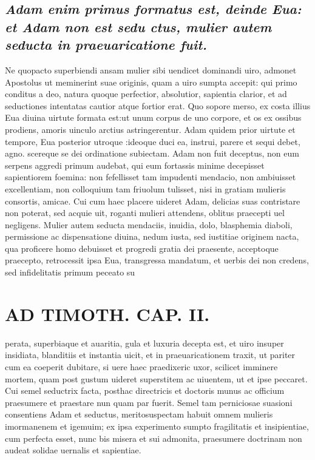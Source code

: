 \documentclass{article}
\begin{document}
\begin{pages}
\subsection*{\textit{Adam enim primus formatus est, deinde Eua: et Adam non est sedu ctus, mulier autem seducta in praeuaricatione fuit. }}\pstart Ne quopacto superbiendi ansam mulier sibi uendicet dominandi uiro, admonet Apostolus ut meminerint suae originis, quam a uiro sumpta accepit: qui primo conditus a deo, natura quoque perfectior, absolutior, sapientia clarior, et ad seductiones intentatas cautior atque fortior erat. Quo sopore merso, ex costa illius Eua diuina uirtute formata est:ut unum corpus de uno corpore, et os ex ossibus prodiens, amoris uinculo arctius astringerentur. Adam quidem prior uirtute et tempore, Eua posterior utroque :ideoque duci ea, instrui, parere et sequi debet, agno. scereque se dei ordinatione subiectam. Adam non fuit deceptus, non eum serpens aggredi primum audebat, qui eum fortassis minime decepisset sapientiorem foemina: non fefellisset tam impudenti mendacio, non ambiuisset excellentiam, non colloquium tam friuolum tulisset, nisi in gratiam mulieris consortis, amicae. Cui cum haec placere uideret Adam, delicias suas contristare non poterat, sed acquie uit, roganti mulieri attendens, oblitus praecepti uel negligens. Mulier autem seducta mendaciis, inuidia, dolo, blasphemia diaboli, permissione ac dispensatione diuina, nedum iusta, sed iustitiae originem nacta, qua proficere homo debuisset et progredi gratia dei praesente, acceptoque praecepto, retrocessit ipsa Eua, transgressa mandatum, et uerbis dei non credens, sed infidelitatis primum peceato su  \pend
\section*{AD TIMOTH. CAP. II. }
\marginpar{[ p.489 ]}\pstart perata, superbiaque et auaritia, gula et luxuria decepta est, et uiro insuper insidiata, blanditiis et instantia uicit, et in praeuaricationem traxit, ut pariter cum ea coeperit dubitare, si uere haec praedixeric uxor, scilicet imminere mortem, quam post gustum uideret superstitem ac uiuentem, ut et ipse peccaret. Cui semel seductrix facta, posthac directricis et doctoris munus ac officium praesumere et praestare nun quam par fuerit. Semel tam perniciosae suasioni consentiens Adam et seductus, meritosuspectam habuit omnem mulieris imormanenem et igemuim; ex ipsa experimento sumpto fragilitatis et insipientiae, cum perfecta esset, nunc bis misera et sui admonita, praesumere doctrinam non audeat solidae uernalis et sapientiae.  \pend
{}
{}

\end{pages}
\end{document}
